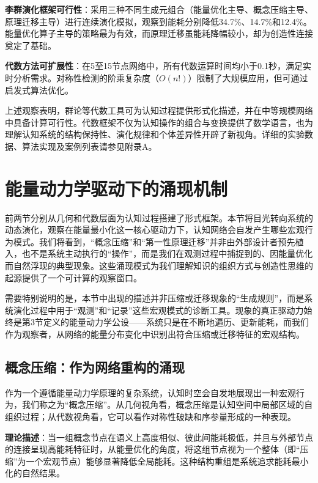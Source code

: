 \documentclass[12pt,a4paper]{article}
\begin{document}
\textbf{李群演化框架可行性}：采用三种不同生成元组合（能量优化主导、概念压缩主导、原理迁移主导）进行连续演化模拟，观察到能耗分别降低34.7\%、14.7\%和12.4\%。能量优化算子主导的策略最为有效，而原理迁移虽能耗降幅较小，却为创造性连接奠定了基础。

\textbf{代数方法可扩展性}：在5至15节点网络中，所有代数运算时间均小于0.1秒，满足实时分析需求。对称性检测的阶乘复杂度（$O(n!)$）限制了大规模应用，但可通过启发式算法优化。

上述观察表明，群论等代数工具可为认知过程提供形式化描述，并在中等规模网络中具备计算可行性。代数框架不仅为认知操作的组合与变换提供了数学语言，也为理解认知系统的结构保持性、演化规律和个体差异性开辟了新视角。详细的实验数据、算法实现及案例列表请参见附录A。

\section{能量动力学驱动下的涌现机制}

前两节分别从几何和代数层面为认知过程搭建了形式框架。本节将目光转向系统的动态演化，观察在能量最小化这一核心驱动力下，认知网络会自发产生哪些宏观行为模式。我们将看到，“概念压缩”和“第一性原理迁移”并非由外部设计者预先植入，也不是系统主动执行的“操作”，而是我们在观测过程中捕捉到的、因能量优化而自然浮现的典型现象。这些涌现模式为我们理解知识的组织方式与创造性思维的起源提供了一个可计算的观察窗口。

需要特别说明的是，本节中出现的描述并非压缩或迁移现象的“生成规则”，而是系统演化过程中用于“观测”和“记录”这些宏观模式的诊断工具。现象的真正驱动力始终是第3节定义的能量动力学公设——系统只是在不断地遍历、更新能耗，而我们作为观察者，从网络的能量分布变化中识别出符合压缩或迁移特征的宏观结构。

\subsection{概念压缩：作为网络重构的涌现}

作为一个遵循能量动力学原理的复杂系统，认知时空会自发地展现出一种宏观行为，我们称之为“概念压缩”。从几何视角看，概念压缩是认知空间中局部区域的自组织过程；从代数视角看，它可以看作对称性破缺和序参量形成的一种表现。

\textbf{理论描述}：当一组概念节点在语义上高度相似、彼此间能耗极低，并且与外部节点的连接呈现高能耗特征时，从能量优化的角度，将这组节点视为一个整体（即“压缩”为一个宏观节点）能够显著降低全局能耗。这种结构重组是系统追求能耗最小化的自然结果。
\end{document}
